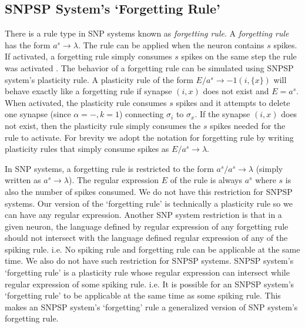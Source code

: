 \documentclass[runningheads,a4paper]{llncs}
\begin{document}

\subsection{SNPSP System's `Forgetting Rule'} \label{sec-forget}

There is a rule type in SNP systems known as \textit{forgetting rule}. A \textit{forgetting rule} has the form $a^s \rightarrow \lambda$. The rule
can be applied when the neuron contains $s$ spikes. If activated, a forgetting rule simply consumes $s$ spikes on the same step the rule was activated
. The behavior of a forgetting rule can be simulated using SNPSP system's plasticity rule. A plasticity rule of the form $E/a^s \rightarrow 
-1(i,\{x\})$ will behave exactly like a forgetting rule if synapse $(i,x)$ does not exist and $E=a^s$. When activated, the plasticity rule consumes 
$s$ spikes and it attempts to delete one synapse (since $\alpha = -, k=1$) connecting $\sigma_i$ to $\sigma_x$. If the synapse $(i,x)$ does not exist, 
then the plasticity rule simply consumes the $s$ spikes needed for the rule to activate. For brevity we adopt the notation for forgetting rule by
writing plasticity rules that simply consume spikes as $E/a^s \rightarrow \lambda$. 

In SNP systems, a forgetting rule is restricted to the form $a^s/a^s \rightarrow \lambda$ (simply written as $a^s \rightarrow \lambda$). The regular
expression $E$ of the rule is always $a^s$ where $s$ is also the number of spikes consumed. We do not have this restriction for SNPSP systems. Our 
version of the `forgetting rule' is technically a plasticity rule so we can have any regular expression. Another SNP system restriction is that in a 
given neuron, the language defined by regular expression of any forgetting rule should not intersect with the language defined regular expression of 
any of the spiking rule. i.e. No spiking rule and forgetting rule can be applicable at the same time. We also do not have such restriction for SNPSP
systems. SNPSP system's `forgetting rule' is a plasticity rule whose regular expression can intersect while regular expression of some spiking rule.
i.e. It is possible for an SNPSP system's `forgetting rule' to be applicable at the same time as some spiking rule. This makes an SNPSP system's 
`forgetting' rule a generalized version of SNP system's forgetting rule.
\end{document}
